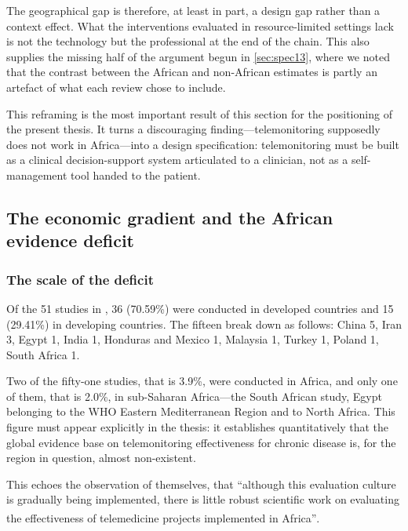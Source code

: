 \documentclass[12pt,a4paper,oneside]{report}
\newcommand{\bq}[1]{``#1''\textsuperscript{\dag}}
\begin{document}
The geographical gap is therefore, at least in part, a design gap rather than a context effect. What the interventions evaluated in resource-limited settings lack is not the technology but the professional at the end of the chain. This also supplies the missing half of the argument begun in \cref{sec:spec13}, where we noted that the contrast between the African and non-African estimates is partly an artefact of what each review chose to include.

This reframing is the most important result of this section for the positioning of the present thesis. It turns a discouraging finding---telemonitoring supposedly does not work in Africa---into a design specification: telemonitoring must be built as a clinical decision-support system articulated to a clinician, not as a self-management tool handed to the patient.

\subsection{The economic gradient and the African evidence deficit}\label{sec:evidence-deficit}

\subsubsection{The scale of the deficit}

Of the 51 studies in \textcite{mao2020}, 36 (70.59\%) were conducted in developed countries and 15 (29.41\%) in developing countries. The fifteen break down as follows: China 5, Iran 3, Egypt 1, India 1, Honduras and Mexico 1, Malaysia 1, Turkey 1, Poland 1, South Africa 1.

Two of the fifty-one studies, that is 3.9\%, were conducted in Africa, and only one of them, that is 2.0\%, in sub-Saharan Africa---the South African study, Egypt belonging to the WHO Eastern Mediterranean Region and to North Africa. This figure must appear explicitly in the thesis: it establishes quantitatively that the global evidence base on telemonitoring effectiveness for chronic disease is, for the region in question, almost non-existent.

This echoes the observation of \textcite{bediang2021} themselves, that \bq{although this evaluation culture is gradually being implemented, there is little robust scientific work on evaluating the effectiveness of telemedicine projects implemented in Africa}.
\end{document}
